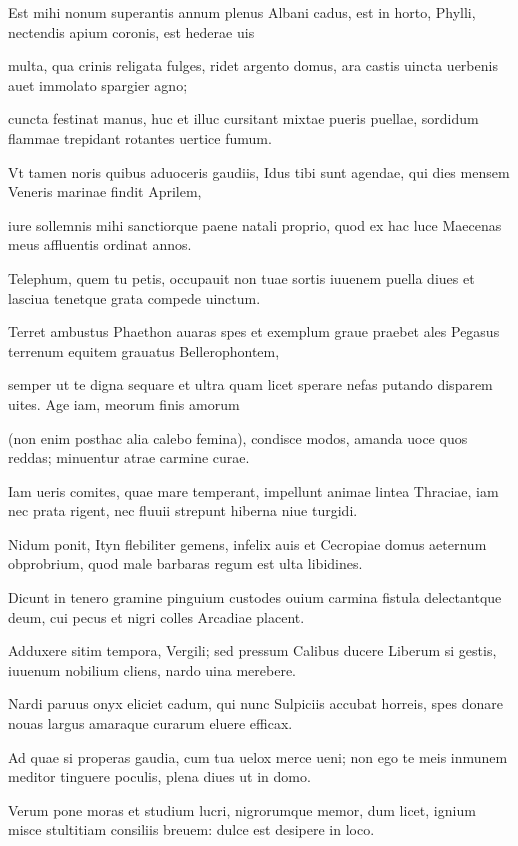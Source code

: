 \documentclass{book}
\newenvironment {carmen} [1] [\relax] 
  {\Titulus \Versus \incipit*\numerus{1}#1}
  {\endVersus}
\newcommand {\Sapphic}   {\Forma \strophae {0 \poena 00 \poena 1}}
\newcommand {\AsclA}     {\Forma \strophae {0 \poena 00 \poena 2}}
\begin{document}
\begin{carmen}[\Sapphic]


Est mihi nonum superantis annum
 plenus Albani cadus, est in horto,
 Phylli, nectendis apium coronis,
      est hederae uis
 
multa, qua crinis religata fulges,               
 ridet argento domus, ara castis
 uincta uerbenis auet immolato
      spargier agno;
 
cuncta festinat manus, huc et illuc
 cursitant mixtae pueris puellae,               
 sordidum flammae trepidant rotantes
      uertice fumum.
 
Vt tamen noris quibus aduoceris
 gaudiis, Idus tibi sunt agendae,
 qui dies mensem Veneris marinae               
      findit Aprilem,
 
iure sollemnis mihi sanctiorque
 paene natali proprio, quod ex hac
 luce Maecenas meus affluentis
      ordinat annos.               
 
Telephum, quem tu petis, occupauit
 non tuae sortis iuuenem puella
 diues et lasciua tenetque grata
      compede uinctum.
 
Terret ambustus Phaethon auaras               
 spes et exemplum graue praebet ales
 Pegasus terrenum equitem grauatus
      Bellerophontem,
 
semper ut te digna sequare et ultra
 quam licet sperare nefas putando               
 disparem uites. Age iam, meorum
      finis amorum
 
(non enim posthac alia calebo
 femina), condisce modos, amanda
 uoce quos reddas; minuentur atrae               
      carmine curae.
 

\end{carmen}

\begin{carmen}[\AsclA]


Iam ueris comites, quae mare temperant,
 impellunt animae lintea Thraciae,
 iam nec prata rigent, nec fluuii strepunt
      hiberna niue turgidi.
 
Nidum ponit, Ityn flebiliter gemens,               
 infelix auis et Cecropiae domus
 aeternum obprobrium, quod male barbaras
      regum est ulta libidines.
 
Dicunt in tenero gramine pinguium
 custodes ouium carmina fistula               
 delectantque deum, cui pecus et nigri
      colles Arcadiae placent.
 
Adduxere sitim tempora, Vergili;
 sed pressum Calibus ducere Liberum
 si gestis, iuuenum nobilium cliens,               
      nardo uina merebere.
 
Nardi paruus onyx eliciet cadum,
 qui nunc Sulpiciis accubat horreis,
 spes donare nouas largus amaraque
      curarum eluere efficax.               
 
Ad quae si properas gaudia, cum tua
 uelox merce ueni; non ego te meis
 inmunem meditor tinguere poculis,
      plena diues ut in domo.
 
Verum pone moras et studium lucri,               
 nigrorumque memor, dum licet, ignium
 misce stultitiam consiliis breuem:
      dulce est desipere in loco.
 

\end{carmen}
\end{document}
